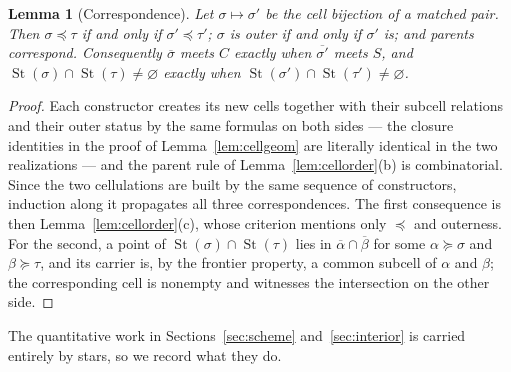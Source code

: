 \documentclass[11pt,a4paper]{article}
\theoremstyle{jsplain}
\newtheorem{lemma}[theorem]{Lemma}
\theoremstyle{jsdefn}
\newcommand{\St}{\operatorname{St}}
\begin{document}
\begin{lemma}[Correspondence]\label{lem:corr}
Let $\sigma\mapsto\sigma'$ be the cell bijection of a matched pair.
Then $\sigma\preceq\tau$ if and only if $\sigma'\preceq\tau'$; $\sigma$
is outer if and only if $\sigma'$ is; and parents correspond.
Consequently $\overline\sigma$ meets $C$ exactly when
$\overline{\sigma'}$ meets $S$, and
$\St(\sigma)\cap\St(\tau)\ne\varnothing$ exactly when
$\St(\sigma')\cap\St(\tau')\ne\varnothing$.
\end{lemma}
\begin{proof}
Each constructor creates its new cells together with their subcell
relations and their outer status by the same formulas on both sides ---
the closure identities in the proof of Lemma~\ref{lem:cellgeom} are
literally identical in the two realizations --- and the parent rule of
Lemma~\ref{lem:cellorder}(b) is combinatorial. Since the two
cellulations are built by the same sequence of constructors, induction
along it propagates all three correspondences. The first consequence is
then Lemma~\ref{lem:cellorder}(c), whose criterion mentions only
$\preceq$ and outerness. For the second, a point of
$\St(\sigma)\cap\St(\tau)$ lies in $\overline\alpha\cap\overline\beta$
for some $\alpha\succeq\sigma$ and $\beta\succeq\tau$, and its carrier
is, by the frontier property, a common subcell of $\alpha$ and $\beta$;
the corresponding cell is nonempty and witnesses the intersection on
the other side.
\end{proof}

The quantitative work in Sections~\ref{sec:scheme}
and~\ref{sec:interior} is carried entirely by stars, so we record what
they do.
\end{document}
